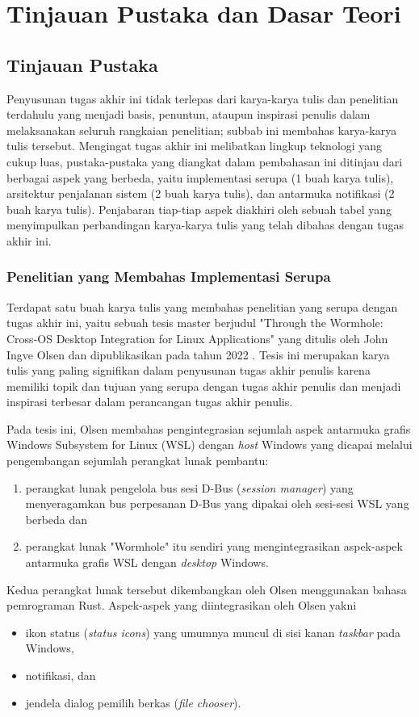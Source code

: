 \chapter{Tinjauan Pustaka dan Dasar Teori}

\section{Tinjauan Pustaka}

Penyusunan tugas akhir ini tidak terlepas dari karya-karya tulis dan penelitian terdahulu yang menjadi basis, penuntun, ataupun inspirasi penulis dalam melaksanakan seluruh rangkaian penelitian; subbab ini membahas karya-karya tulis tersebut. Mengingat tugas akhir ini melibatkan lingkup teknologi yang cukup luas, pustaka-pustaka yang diangkat dalam pembahasan ini ditinjau dari berbagai aspek yang berbeda, yaitu implementasi serupa (1 buah karya tulis), arsitektur penjalanan sistem (2 buah karya tulis), dan antarmuka notifikasi (2 buah karya tulis). Penjabaran tiap-tiap aspek diakhiri oleh sebuah tabel yang menyimpulkan perbandingan karya-karya tulis yang telah dibahas dengan tugas akhir ini.

\subsection{Penelitian yang Membahas Implementasi Serupa}

Terdapat satu buah karya tulis yang membahas penelitian yang serupa dengan tugas akhir ini, yaitu sebuah tesis master berjudul "Through the Wormhole: Cross-OS Desktop Integration for Linux Applications" yang ditulis oleh John Ingve Olsen dan dipublikasikan pada tahun 2022 \cite{olsen-2022-through-the-wormhole}. Tesis ini merupakan karya tulis yang paling signifikan dalam penyusunan tugas akhir penulis karena memiliki topik dan tujuan yang serupa dengan tugas akhir penulis dan menjadi inspirasi terbesar dalam perancangan tugas akhir penulis.

Pada tesis ini, Olsen membahas pengintegrasian sejumlah aspek antarmuka grafis Windows Subsystem for Linux (WSL) dengan \textit{host} Windows yang dicapai melalui pengembangan sejumlah perangkat lunak pembantu:
\begin{enumerate}
    \item perangkat lunak pengelola bus sesi D-Bus (\textit{session manager}) yang menyeragamkan bus perpesanan D-Bus yang dipakai oleh sesi-sesi WSL yang berbeda dan
    \item perangkat lunak "Wormhole" itu sendiri yang mengintegrasikan aspek-aspek antarmuka grafis WSL dengan \textit{desktop} Windows.
\end{enumerate}
Kedua perangkat lunak tersebut dikembangkan oleh Olsen menggunakan bahasa pemrograman Rust. Aspek-aspek yang diintegrasikan oleh Olsen yakni
\begin{itemize}
    \item ikon status (\textit{status icons}) yang umumnya muncul di sisi kanan \textit{taskbar} pada Windows,
    \item notifikasi, dan
    \item jendela dialog pemilih berkas (\textit{file chooser}).
\end{itemize}

